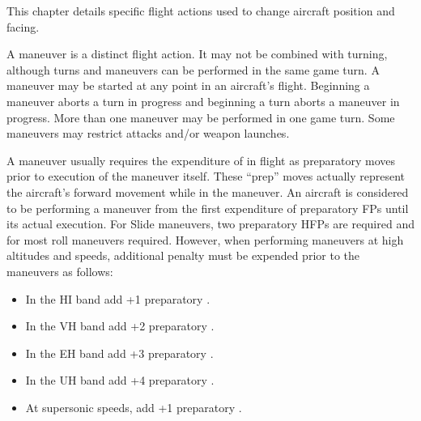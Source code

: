 
\label{rule:special-maneuvers}

This chapter details specific flight actions used to change aircraft position and facing.

A maneuver is a distinct flight action. It may not be combined with turning, although turns and maneuvers can be performed in the same game turn. A maneuver may be started at any point in an aircraft's flight. Beginning a maneuver aborts a turn in progress and beginning a turn aborts a maneuver in progress. More than one maneuver may be performed in one game turn. Some maneuvers may restrict attacks and/or weapon launches.


A maneuver usually requires the expenditure of  in flight as preparatory moves prior to execution of the maneuver itself.  These “prep” moves actually represent the aircraft's forward movement while in the maneuver. An aircraft is considered to be performing a maneuver from the first expenditure of preparatory FPs until its actual execution. For Slide maneuvers, two preparatory HFPs are required and for most roll maneuvers  required. However, when performing maneuvers at high altitudes and speeds, additional penalty  must be expended prior to the maneuvers as follows:

\begin{itemize}
    \item In the HI band add +1 preparatory .
    \item In the VH band add +2 preparatory .
    \item In the EH band add +3 preparatory .
    \item In the UH band add +4 preparatory .
    \item At supersonic speeds, add +1 preparatory .
\end{itemize}


